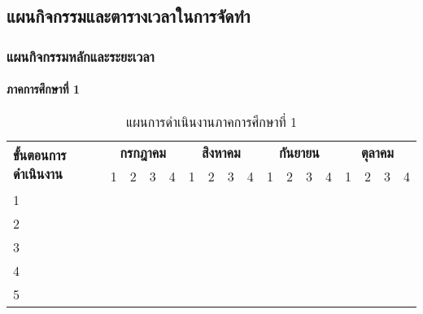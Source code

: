 \documentclass[12pt,a4paper]{article}
\begin{document}
\subsection{แผนกิจกรรมและตารางเวลาในการจัดทำ}

\subsubsection{แผนกิจกรรมหลักและระยะเวลา}

\paragraph{ภาคการศึกษาที่ 1}
\begin{table}[htbp]
    \centering
    \caption{แผนการดำเนินงานภาคการศึกษาที่ 1}
    \begin{tabular}{|l|c|c|c|c|c|c|c|c|c|c|c|c|c|c|c|c|}
        \hline
        \multirow{2}{*}{\textbf{ขั้นตอนการดำเนินงาน}} & \multicolumn{4}{c|}{\textbf{กรกฎาคม}} & \multicolumn{4}{c|}{\textbf{สิงหาคม}} & \multicolumn{4}{c|}{\textbf{กันยายน}} & \multicolumn{4}{c|}{\textbf{ตุลาคม}} \\
        \cline{2-17}
        & 1 & 2 & 3 & 4 & 1 & 2 & 3 & 4 & 1 & 2 & 3 & 4 & 1 & 2 & 3 & 4 \\
        \hline
        1 & & & & & & & & & & & & & & & & \\
        \hline
        2 & & & & & & & & & & & & & & & & \\
        \hline
        3 & & & & & & & & & & & & & & & & \\
        \hline
        4 & & & & & & & & & & & & & & & & \\
        \hline
        5 & & & & & & & & & & & & & & & & \\
        \hline
    \end{tabular}
    \label{tab:semester1}
\end{table}
\end{document}
